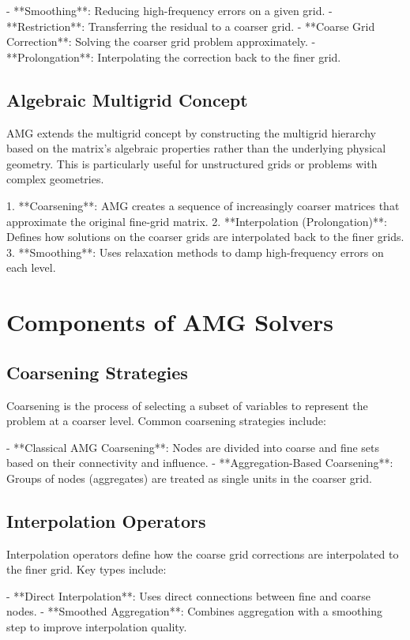 - **Smoothing**: Reducing high-frequency errors on a given grid.
- **Restriction**: Transferring the residual to a coarser grid.
- **Coarse Grid Correction**: Solving the coarser grid problem approximately.
- **Prolongation**: Interpolating the correction back to the finer grid.

\subsection{Algebraic Multigrid Concept}

AMG extends the multigrid concept by constructing the multigrid hierarchy based on the matrix's algebraic properties rather than the underlying physical geometry. This is particularly useful for unstructured grids or problems with complex geometries.

1. **Coarsening**: AMG creates a sequence of increasingly coarser matrices that approximate the original fine-grid matrix.
2. **Interpolation (Prolongation)**: Defines how solutions on the coarser grids are interpolated back to the finer grids.
3. **Smoothing**: Uses relaxation methods to damp high-frequency errors on each level.

\section{Components of AMG Solvers}

\subsection{Coarsening Strategies}

Coarsening is the process of selecting a subset of variables to represent the problem at a coarser level. Common coarsening strategies include:

- **Classical AMG Coarsening**: Nodes are divided into coarse and fine sets based on their connectivity and influence.
- **Aggregation-Based Coarsening**: Groups of nodes (aggregates) are treated as single units in the coarser grid.

\subsection{Interpolation Operators}

Interpolation operators define how the coarse grid corrections are interpolated to the finer grid. Key types include:

- **Direct Interpolation**: Uses direct connections between fine and coarse nodes.
- **Smoothed Aggregation**: Combines aggregation with a smoothing step to improve interpolation quality.

